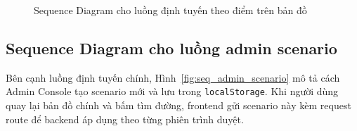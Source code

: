 \documentclass[../DoAn.tex]{subfiles}
\begin{document}
\begin{figure}[H]
{%
}
\caption{Sequence Diagram cho luồng định tuyến theo điểm trên bản đồ}
\label{fig:seq_route_points}
\end{figure}

\subsection{Sequence Diagram cho luồng admin scenario}
Bên cạnh luồng định tuyến chính, Hình~\ref{fig:seq_admin_scenario} mô tả cách Admin Console tạo scenario mới và lưu trong \texttt{localStorage}. Khi người dùng quay lại bản đồ chính và bấm tìm đường, frontend gửi scenario này kèm request route để backend áp dụng theo từng phiên trình duyệt.
\end{document}
